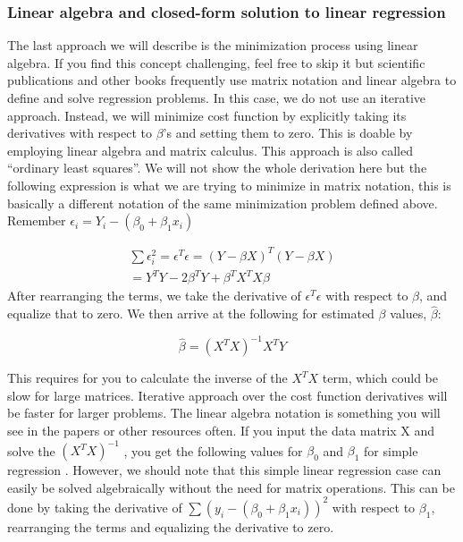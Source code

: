 \documentclass[12pt,]{krantz}
\begin{document}
\hypertarget{linear-algebra-and-closed-form-solution-to-linear-regression}{%
\subsubsection{Linear algebra and closed-form solution to linear regression}\label{linear-algebra-and-closed-form-solution-to-linear-regression}}

The last approach we will describe is the minimization process using linear
algebra. If you find this concept challenging, feel free to skip it but scientific publications and other books frequently use matrix notation and linear algebra to define and solve regression problems. In this case, we do not use an iterative approach. Instead, we will
minimize cost function by explicitly taking its derivatives with respect to
\(\beta\)'s and setting them to zero. This is doable by employing linear algebra
and matrix calculus. This approach is also called ``ordinary least squares''. We
will not
show the whole derivation here but the following expression
is what we are trying to minimize in matrix notation, this is basically a
different notation of the same minimization problem defined above. Remember
\(\epsilon_i=Y_i-(\beta_0+\beta_1x_i)\)

\[
\begin{aligned}
\sum\epsilon_{i}^2=\epsilon^T\epsilon=(Y-{\beta}{X})^T(Y-{\beta}{X}) \\
=Y^T{Y}-2{\beta}^T{Y}+{\beta}^TX^TX{\beta}
\end{aligned}
\]
After rearranging the terms, we take the derivative of \(\epsilon^T\epsilon\)
with respect to \(\beta\), and equalize that to zero. We then arrive at
the following for estimated \(\beta\) values, \(\hat{\beta}\):

\[\hat{\beta}=(X^TX)^{-1}X^TY\]

This requires for you to calculate the inverse of the \(X^TX\) term, which could
be slow for large matrices. Iterative approach over the cost function
derivatives will be faster for larger problems.
The linear algebra notation is something you will see in the papers
or other resources often. If you input the data matrix X and solve the \((X^TX)^{-1}\)
,
you get the following values for \(\beta_0\) and \(\beta_1\) for simple regression
. However, we should note that this simple linear regression case can easily
be solved algebraically without the need for matrix operations. This can be done
by taking the derivative of \(\sum{(y_i-(\beta_0+\beta_1x_i))^2}\) with respect to
\(\beta_1\), rearranging the terms and equalizing the derivative to zero.
\end{document}

